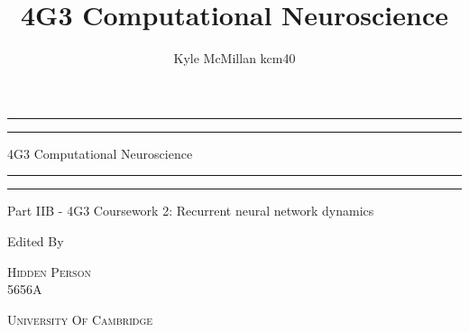 \documentclass[a4paper, 11pt, oneside]{report}
\author{Kyle McMillan kcm40}
\title{4G3 Computational Neuroscience}
\begin{document}

\begin{titlepage}
    \centering %
	
	\scshape %
	
	\vspace*{\baselineskip} %
	
	\rule{\textwidth}{1.6pt}\vspace*{-\baselineskip}\vspace*{2pt} %
	\rule{\textwidth}{0.4pt} %
	
	\vspace{0.75\baselineskip} %
	
	{\LARGE 4G3 Computational Neuroscience} %
	
	\vspace{0.75\baselineskip} %
	
	\rule{\textwidth}{0.4pt}\vspace*{-\baselineskip}\vspace{3.2pt} %
	\rule{\textwidth}{1.6pt} %
	
	\vspace{2\baselineskip} %
	
	
	Part IIB - 4G3 Coursework 2: Recurrent neural network dynamics%
	
	\vspace*{3\baselineskip} %
	
	
	Edited By
	
	\vspace{0.5\baselineskip} %
	
	{\scshape\Large Hidden Person \\ 5656A} %
	
	\vspace{0.5\baselineskip} %
	
    \textsc{University Of Cambridge} %
	
	\vfill %

\end{titlepage}
\end{document}
